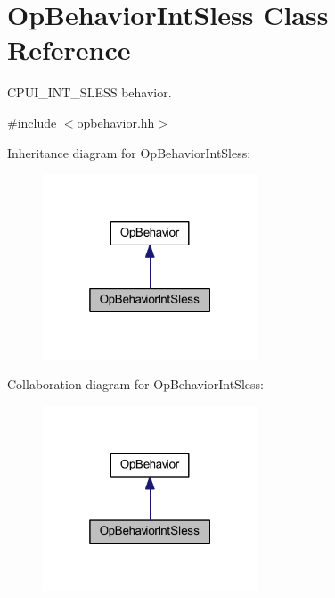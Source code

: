 \hypertarget{class_op_behavior_int_sless}{}\section{Op\+Behavior\+Int\+Sless Class Reference}
\label{class_op_behavior_int_sless}


C\+P\+U\+I\+\_\+\+I\+N\+T\+\_\+\+S\+L\+E\+SS behavior.  




{\ttfamily \#include $<$opbehavior.\+hh$>$}



Inheritance diagram for Op\+Behavior\+Int\+Sless\+:
\nopagebreak
\begin{figure}[H]
\begin{center}
\leavevmode
\includegraphics[width=181pt]{class_op_behavior_int_sless__inherit__graph}
\end{center}
\end{figure}


Collaboration diagram for Op\+Behavior\+Int\+Sless\+:
\nopagebreak
\begin{figure}[H]
\begin{center}
\leavevmode
\includegraphics[width=181pt]{class_op_behavior_int_sless__coll__graph}
\end{center}
\end{figure}
